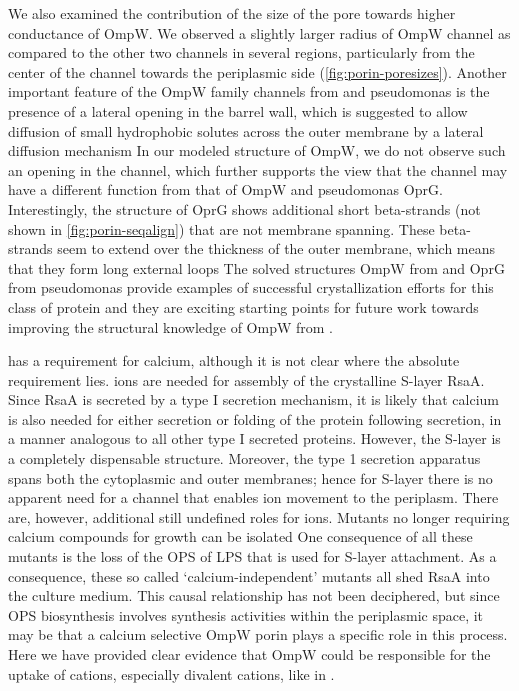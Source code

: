 We also examined the contribution of the size of the pore towards higher conductance of \caulobacter OmpW. We observed a slightly larger radius of \caulobacter OmpW channel as compared to the other two channels in several regions, particularly from the center of the channel towards the periplasmic side (\cref{fig:porin-poresizes}). Another important feature of the OmpW family channels from \ecoli and \ac{pseudomonas} is the presence of a lateral opening in the barrel wall, which is suggested to allow diffusion of small hydrophobic solutes across the outer membrane by a lateral diffusion mechanism In our modeled structure of \caulobacter OmpW, we do not observe such an opening in the channel, which further supports the view that the \caulobacter channel may have a different function from that of \ecoli OmpW and \ac{pseudomonas} OprG. Interestingly, the structure of OprG shows additional short beta-strands (not shown in \cref{fig:porin-seqalign}) that are not membrane spanning. These beta-strands seem to extend over the thickness of the outer membrane, which means that they form long external loops The solved structures OmpW from \ecoli and OprG from \ac{pseudomonas} provide examples of  successful crystallization efforts for this class of protein and they are exciting starting points for future work towards improving the structural knowledge of OmpW from \caulobacter.

\caulobacter has a requirement for calcium, although it is not clear where the absolute requirement lies.  ions are needed for assembly of the crystalline \ac{S-layer} RsaA. Since RsaA is secreted by a type I secretion mechanism, it is likely that calcium is also needed for either secretion or folding of the protein following secretion, in a manner analogous to all other type I secreted proteins.  However, the \ac{S-layer} is a completely dispensable structure. Moreover, the type 1 secretion apparatus spans both the cytoplasmic and outer membranes; hence for \ac{S-layer} there is no apparent need for a channel that enables  ion movement to the periplasm. There are, however, additional still undefined roles for  ions. Mutants no longer requiring calcium compounds for growth can be isolated One consequence of all these mutants is the loss of the \ac{OPS} of \ac{LPS} that is used for \ac{S-layer} attachment. As a consequence, these so called `calcium-independent' mutants all shed RsaA into the culture medium. This causal relationship has not been deciphered, but since \ac{OPS} biosynthesis involves synthesis activities within the periplasmic space, it may be that a calcium selective OmpW porin plays a specific role in this process. Here we have provided clear evidence that OmpW could be responsible for the uptake of cations, especially divalent cations, like  in \caulobacter. 
